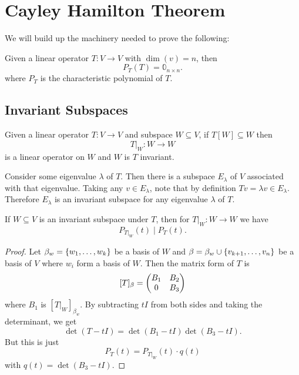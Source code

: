 \documentclass{subfiles}
\begin{document}
\chapter{Cayley Hamilton Theorem}

We will build up the machinery needed to prove the following:

\begin{theorem}
    Given a linear operator $T : V \to V$ with $\dim(v) = n$, then
    \[
        P_T(T) = \mathbb{0}_{n\times n}
    .\]
    where $P_T$ is the characteristic polynomial of $T$.
\end{theorem}

\section{Invariant Subspaces}

\begin{definition}
    Given a linear operator $T : V \to V$ and subspace $W \subseteq V$, if $T[W] \subseteq W$ then
    \[
        T |_W : W \to W
    \]
    is a linear operator on $W$ and $W$ is $T$ invariant.
\end{definition}

\begin{example}
    Consider some eigenvalue $\lambda$ of $T$. Then there is a subspace $E_\lambda$ of $V$ associated with that eigenvalue. Taking any $v \in E_\lambda$, note that by definition $Tv = \lambda v \in E_\lambda$. Therefore $E_\lambda$ is an invariant subspace for any eigenvalue $\lambda$ of $T$.
\end{example}

\begin{theorem}
    If $W \subseteq V$ is an invariant subspace under $T$, then for $T |_W : W \to W$ we have
    \[
        P_{T|_W}(t) \;\vert\; P_T(t)
    .\]
\end{theorem}

\begin{proof}
    Let $\beta_w = \qty{w_1, \ldots, w_k}$ be a basis of $W$ and $\beta = \beta_w \cup \qty{v_{k+1}, \ldots, v_n}$ be a basis of $V$ where $w_i$ form a basis of $W$. Then the matrix form of $T$ is
    \[
        [T]_\beta = \mqty(
        B_{1} & B_2 \\
        0 & B_3
        )
    \]
    where $B_1$ is $[T|_W]_{\beta_w}$. By subtracting $t I$ from both sides and taking the determinant, we get
    \[
        \det(T - tI) = \det(B_1 - tI) \det(B_3 - tI)
    .\]
    But this is just
    \[
        P_T(t) = P_{T|_W}(t) \cdot q(t)
    \]
    with $q(t) = \det(B_3 - t I)$.
\end{proof}
\end{document}
